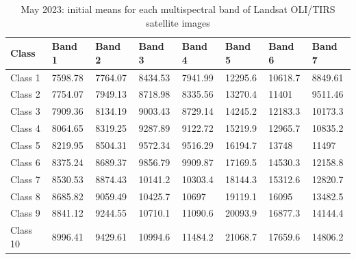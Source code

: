 \documentclass[geomatics,article,submit,pdftex,moreauthors]{Definitions/mdpi}
\begin{document}
\begin{table}[H]
\centering
\begin{tabularx}{\textwidth}{| p{1.5cm} | X | X | X | X | X | X | X | }
  \toprule
   Class & Band 1 & Band 2 & Band 3 & Band 4 & Band 5 & Band 6 & Band 7  \\
   \midrule
    Class 1 & 7598.78 & 7764.07 & 8434.53 & 7941.99 & 12295.6 & 10618.7 & 8849.61 \\
    Class 2 & 7754.07 & 7949.13 & 8718.98 & 8335.56 & 13270.4 & 11401 & 9511.46 \\
    Class 3 & 7909.36 & 8134.19 & 9003.43 & 8729.14 & 14245.2 & 12183.3 & 10173.3 \\
    Class 4 & 8064.65 & 8319.25 & 9287.89 & 9122.72 & 15219.9 & 12965.7 & 10835.2 \\
    Class 5 & 8219.95 & 8504.31 & 9572.34 & 9516.29 & 16194.7 & 13748 & 11497 \\
    Class 6 & 8375.24 & 8689.37 & 9856.79 & 9909.87 & 17169.5 & 14530.3 & 12158.8 \\
    Class 7 & 8530.53 & 8874.43 & 10141.2 & 10303.4 & 18144.3 & 15312.6 & 12820.7 \\
    Class 8 & 8685.82 & 9059.49 & 10425.7 & 10697 & 19119.1 & 16095 & 13482.5 \\
    Class 9 & 8841.12 & 9244.55 & 10710.1 & 11090.6 & 20093.9 & 16877.3 & 14144.4 \\
    Class 10 & 8996.41 & 9429.61 & 10994.6 & 11484.2 & 21068.7 & 17659.6 & 14806.2 \\
    \bottomrule
\end{tabularx}
\caption{May 2023: initial means for each multispectral band of Landsat OLI/TIRS satellite images}\label{tabA03}
\end{table}
\end{document}
